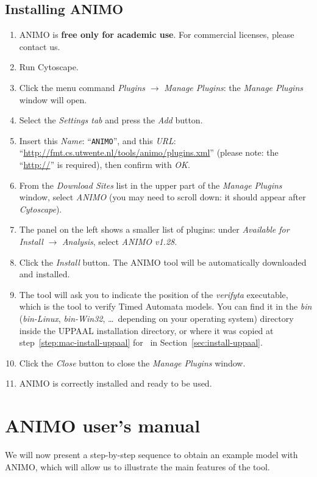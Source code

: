 \subsection{Installing ANIMO}\label{sec:install-animo}
\begin{enumerate}
\item ANIMO is {\bfseries free only for academic use}. For commercial licenses, please contact us.
\item Run Cytoscape.
\item Click the menu command \emph{Plugins} $\rightarrow$ \emph{Manage Plugins}: the \emph{Manage Plugins}
window will open.
\item Select the \emph{Settings tab} and press the \emph{Add} button.
\item Insert this \emph{Name}: ``{\tt ANIMO}'', and this \emph{URL}:
``\url{http://fmt.cs.utwente.nl/tools/animo/plugins.xml}''
(please note: the ``\url{http://}'' is required), then confirm with \emph{OK}.
\item From the \emph{Download Sites} list in the upper part of the \emph{Manage Plugins} window, select \emph{ANIMO}
(you may need to scroll down: it should appear after \emph{Cytoscape}).
\item The panel on the left shows a smaller list of plugins: under \emph{Available for Install} $\rightarrow$
\emph{Analysis},
select \emph{ANIMO v1.28}.
\item Click the \emph{Install} button. The ANIMO tool will be automatically downloaded and installed.
\item The tool will ask you to indicate the position of the \emph{verifyta} executable, which is the tool to verify Timed Automata models.
You can find it in the \emph{bin} (\emph{bin-Linux}, \emph{bin-Win32}, \dots\ depending on your operating system) directory inside the
UPPAAL installation directory, or where it was copied at step~\ref{step:mac-install-uppaal} for \macsymbol\ in Section~\ref{sec:install-uppaal}.
\item Click the \emph{Close} button to close the \emph{Manage Plugins} window.
\item ANIMO is correctly installed and ready to be used.
\end{enumerate}

\clearpage
\section{ANIMO user's manual}\label{sec:animo-manual}
We will now present a step-by-step sequence to obtain an example model
with ANIMO, which will allow us to illustrate the main features of the tool.

